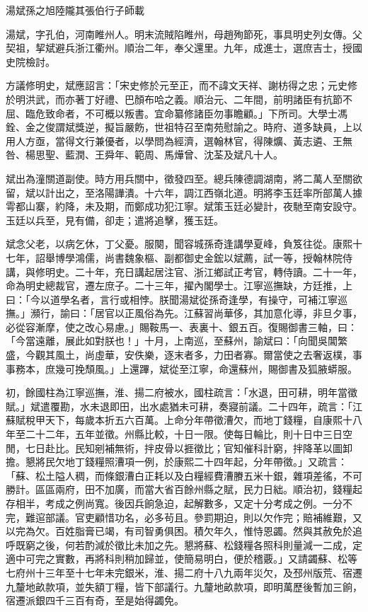 
\begin{pinyinscope}
湯斌孫之旭陸隴其張伯行子師載

湯斌，字孔伯，河南睢州人。明末流賊陷睢州，母趙殉節死，事具明史列女傳。父契祖，挈斌避兵浙江衢州。順治二年，奉父還里。九年，成進士，選庶吉士，授國史院檢討。

方議修明史，斌應詔言：「宋史修於元至正，而不諱文天祥、謝枋得之忠；元史修於明洪武，而亦著丁好禮、巴顏布哈之義。順治元、二年間，前明諸臣有抗節不屈、臨危致命者，不可概以叛書。宜命纂修諸臣勿事瞻顧。」下所司。大學士馮銓、金之俊謂斌獎逆，擬旨嚴飭，世祖特召至南苑慰諭之。時府、道多缺員，上以用人方亟，當得文行兼優者，以學問為經濟，選翰林官，得陳爌、黃志遴、王無咎、楊思聖、藍潤、王舜年、範周、馬燁曾、沈荃及斌凡十人。

斌出為潼關道副使。時方用兵關中，徵發四至。總兵陳德調湖南，將二萬人至關欲留，斌以計出之，至洛陽譁潰。十六年，調江西嶺北道。明將李玉廷率所部萬人據雩都山寨，約降，未及期，而鄭成功犯江寧。斌策玉廷必變計，夜馳至南安設守。玉廷以兵至，見有備，卻走；遣將追擊，獲玉廷。

斌念父老，以病乞休，丁父憂。服闋，聞容城孫奇逢講學夏峰，負笈往從。康熙十七年，詔舉博學鴻儒，尚書魏象樞、副都御史金鋐以斌薦，試一等，授翰林院侍講，與修明史。二十年，充日講起居注官、浙江鄉試正考官，轉侍讀。二十一年，命為明史總裁官，遷左庶子。二十三年，擢內閣學士。江寧巡撫缺，方廷推，上曰：「今以道學名者，言行或相悖。朕聞湯斌從孫奇逢學，有操守，可補江寧巡撫。」瀕行，諭曰：「居官以正風俗為先。江蘇習尚華侈，其加意化導，非旦夕事，必從容漸摩，使之改心易慮。」賜鞍馬一、表裏十、銀五百。復賜御書三軸，曰：「今當遠離，展此如對朕也！」十月，上南巡，至蘇州，諭斌曰：「向聞吳閶繁盛，今觀其風土，尚虛華，安佚樂，逐末者多，力田者寡。爾當使之去奢返樸，事事務本，庶幾可挽頹風。」上還蹕，斌從至江寧，命還蘇州，賜御書及狐腋蟒服。

初，餘國柱為江寧巡撫，淮、揚二府被水，國柱疏言：「水退，田可耕，明年當徵賦。」斌遣覆勘，水未退即田，出水處猶未可耕，奏寢前議。二十四年，疏言：「江蘇賦稅甲天下，每歲本折五六百萬。上命分年帶徵漕欠，而地丁錢糧，自康熙十八年至二十二年，五年並徵。州縣比較，十日一限。使每日輪比，則十日中三日空閒，七日赴比。民知剜補無術，拌皮骨以捱徵比；官知催科計窮，拌降革以圖卸擔。懇將民欠地丁錢糧照漕項一例，於康熙二十四年起，分年帶徵。」又疏言：「蘇、松土隘人稠，而條銀漕白正耗以及白糧經費漕賸五米十銀，雜項差徭，不可勝計。區區兩府，田不加廣，而當大省百餘州縣之賦，民力日絀。順治初，錢糧起存相半，考成之例尚寬。後因兵餉急迫，起解數多，又定十分考成之例。一分不完，難逭部議。官吏顧惜功名，必多茍且。參罰期迫，則以欠作完；賠補維艱，又以完為欠。百姓脂膏已竭，有司智勇俱困。積欠年久，惟恃恩蠲。然與其赦免於追呼既窮之後，何若酌減於徵比未加之先。懇將蘇、松錢糧各照科則量減一二成，定適中可完之實數，再將科則稍加歸並，使簡易明白，便於稽覈。」又請蠲蘇、松等七府州十三年至十七年未完銀米，淮、揚二府十八九兩年災欠，及邳州版荒、宿遷九釐地畝款項，並失額丁糧，皆下部議行。九釐地畝款項，即明萬歷後暫加三餉，宿遷派銀四千三百有奇，至是始得蠲免。


\end{pinyinscope}
